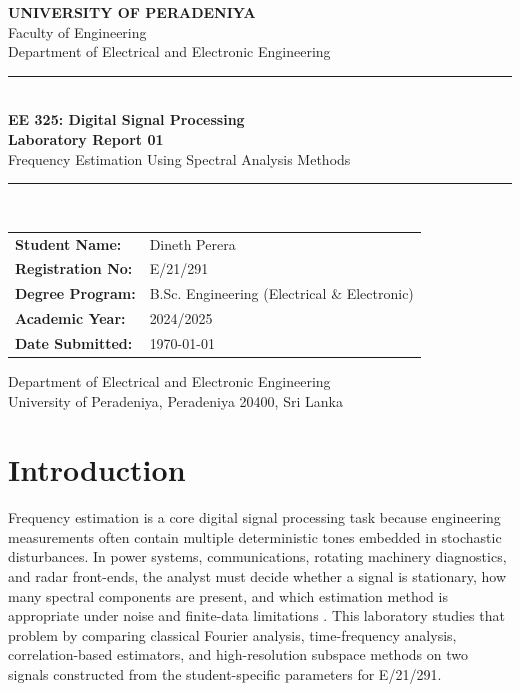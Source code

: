 \documentclass[12pt, a4paper]{article}
\begin{document}
\begin{titlepage}
  \begin{center}
    \vspace*{1cm}
    {\large \textbf{UNIVERSITY OF PERADENIYA}} \\[0.3cm]
    {\large Faculty of Engineering} \\[0.3cm]
    {\large Department of Electrical and Electronic Engineering} \\[2cm]

    \rule{\linewidth}{0.5mm} \\[0.4cm]
    {\LARGE \textbf{EE 325: Digital Signal Processing}} \\[0.3cm]
    {\Large \textbf{Laboratory Report 01}} \\[0.3cm]
    {\Large Frequency Estimation Using Spectral Analysis Methods} \\[0.2cm]
    \rule{\linewidth}{0.5mm} \\[2cm]

    \begin{tabular}{ll}
      \textbf{Student Name:}    & Dineth Perera \\[0.2cm]
      \textbf{Registration No:} & E/21/291 \\[0.2cm]
      \textbf{Degree Program:}  & B.Sc. Engineering (Electrical \& Electronic) \\[0.2cm]
      \textbf{Academic Year:}   & 2024/2025 \\[0.2cm]
      \textbf{Date Submitted:}  & \today \\[0.2cm]
    \end{tabular}

    \vfill
    {\small Department of Electrical and Electronic Engineering \\
    University of Peradeniya, Peradeniya 20400, Sri Lanka}
  \end{center}
\end{titlepage}

\clearpage
{}
\tableofcontents
\newpage

\section{Introduction}
Frequency estimation is a core digital signal processing task because engineering measurements often contain multiple deterministic tones embedded in stochastic disturbances. In power systems, communications, rotating machinery diagnostics, and radar front-ends, the analyst must decide whether a signal is stationary, how many spectral components are present, and which estimation method is appropriate under noise and finite-data limitations \cite{oppenheim2010, proakis2007}. This laboratory studies that problem by comparing classical Fourier analysis, time-frequency analysis, correlation-based estimators, and high-resolution subspace methods on two signals constructed from the student-specific parameters for E/21/291.
\end{document}
